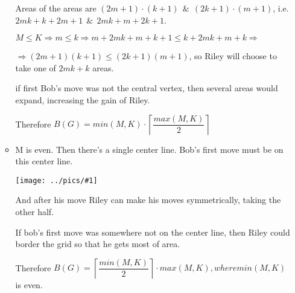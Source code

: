 \documentclass[12pt,a4paper, flushleft]{article}
\newcommand{\gr}[1]{\texttt{[image: ../pics/\#1]}}
\newcommand{\ceil}[1]{\left\lceil #1 \right\rceil}
\begin{document}
\begin{itemize}
\begin{itemize}
			Areas of the areas are $(2m+1)\cdot (k+1) ~~\&~~ (2k+1)\cdot (m+1)$, i.e. $2mk+k + 2m + 1~~\&~~ 2mk + m + 2k + 1$. 
			
			$M\leqslant K\Rightarrow m\leqslant k\Rightarrow m + 2mk + m + k + 1\leqslant  k + 2mk + m + k\Rightarrow $
			
			$\Rightarrow (2m+1)(k+1)\leqslant (2k+1)(m+1)$, so Riley will choose to take one of  $2mk + k$ areas. %
			
			if first Bob's move was not the central vertex, then several areas would expand, increasing the gain of Riley.
			
			Therefore $B(G) = min(M, K)\cdot \ceil{\dfrac{max(M, K)}{2}}$
			
			\item M is even. Then there's a single center line. Bob's first move must be on this center line.
			
			\gr{b3}
			
			And after his move Riley can make his moves symmetrically, taking the other half.
			
			If bob's first move was somewhere not on the center line, then Riley could border the grid so that he gets most of area.
			
			Therefore $B(G) = \ceil{\dfrac{min(M, K)}{2}}\cdot max(M, K), where min(M, K)$ is even.
		\end{itemize}
	\end{itemize}
\end{document}
